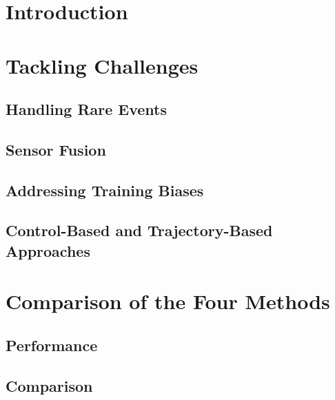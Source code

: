 \maketitle

\begin{abstract}

\end{abstract}

\section{Introduction}


\section{Tackling Challenges}
\subsection{Handling Rare Events}


\subsection{Sensor Fusion}


\subsection{Addressing Training Biases}


\subsection{Control-Based and Trajectory-Based Approaches}


\section{Comparison of the Four Methods}
\subsection{Performance}


\subsection{Comparison}


